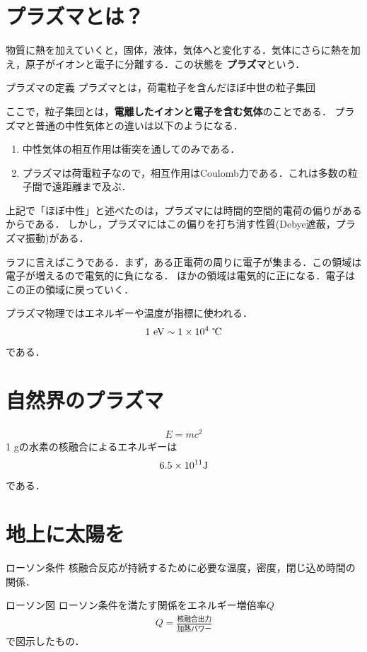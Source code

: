 \documentclass{report}
\begin{document}
\section{プラズマとは？}
物質に熱を加えていくと，固体，液体，気体へと変化する．気体にさらに熱を加え，原子がイオンと電子に分離する．この状態を
\textbf{プラズマ}という．
\begin{itembox}[l]{プラズマの定義}
  プラズマとは，荷電粒子を含んだほぼ中世の粒子集団
\end{itembox}
ここで，粒子集団とは，\textbf{電離したイオンと電子を含む気体}のことである．
プラズマと普通の中性気体との違いは以下のようになる．
\begin{enumerate}
  \item 中性気体の相互作用は衝突を通してのみである．
  \item プラズマは荷電粒子なので，相互作用はCoulomb力である．これは多数の粒子間で遠距離まで及ぶ．
\end{enumerate}

上記で「ほぼ中性」と述べたのは，プラズマには時間的空間的電荷の偏りがあるからである．
しかし，プラズマにはこの偏りを打ち消す性質(Debye遮蔽，プラズマ振動)がある．

ラフに言えばこうである．まず，ある正電荷の周りに電子が集まる．この領域は電子が増えるので電気的に負になる．
ほかの領域は電気的に正になる．電子はこの正の領域に戻っていく．

プラズマ物理ではエネルギーや温度が指標に使われる．
\begin{align}
  1\ \mathrm{eV} \sim 1 \times 10^4\ \text{℃}
\end{align}
である．

\section{自然界のプラズマ}
\begin{align}
  E = mc^2
\end{align}
1 gの水素の核融合によるエネルギーは
\begin{align}
  6.5 \times 10^{11} \mathrm{J}
\end{align}
である．

\section{地上に太陽を}
\begin{itembox}[l]{ローソン条件}
  核融合反応が持続するために必要な温度，密度，閉じ込め時間の関係．  
\end{itembox}
\begin{itembox}[l]{ローソン図}
  ローソン条件を満たす関係をエネルギー増倍率$Q$
  \begin{align}
    Q = \frac{\text{核融合出力}}{\text{加熱パワー}}
  \end{align}
  で図示したもの．
\end{itembox}
\end{document}
